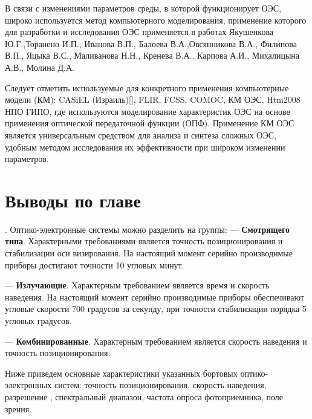 В связи с изменениями параметров среды, в которой функционирует ОЭС, широко используется метод компьютерного моделирования, применение которого для разработки и исследования ОЭС применяется в работах Якушенкова Ю.Г.,Торанено И.П., Иванова В.П., Балоева В.А.,Овсянникова В.А., Филипова В.П., Яцыка В.С., Маливанова Н.Н., Кренева В.А., Карпова А.И., Михалицына А.В., Молина Д.А.

Следует отметить используемые для конкретного применения компьютерные модели (КМ): CASiEL (Израиль)[], FLIR, FCSS, COMOC, КМ ОЭС, Htm2008 НПО ГИПО, где используются моделирование характеристик ОЭС на основе применения оптической передаточной функции (ОПФ). Применение КМ ОЭС является универсальным средством для анализа  и синтеза сложных ОЭС, удобным методом исследования их эффективности при широком изменении параметров.


\section{Выводы по главе} \label{sec:ch1/sec4-}


. Оптико-электронные системы можно разделить на группы:
--- \textbf{Смотрящего типа}. Характерными требованиями является точность позиционирования и стабилизации оси визирования. На настоящий момент серийно производимые приборы достигают точности 10 угловых минут.
	
--- \textbf{Излучающие}. Характерным требованием является время и скорость наведения. На настоящий момент серийно производимые приборы обеспечивают угловые скорости 700 градусов за секунду, при точности стабилизации порядка 5 угловых градусов.
	
--- \textbf{Комбинированные}. Характерным требованием является скорость наведения и точность позиционирования.
	

Ниже приведем основные характеристики указанных бортовых оптико-электронных систем: точность позиционирования, скорость наведения, разрешение , спектральный диапазон, частота опроса фотоприемника, поле зрения.

